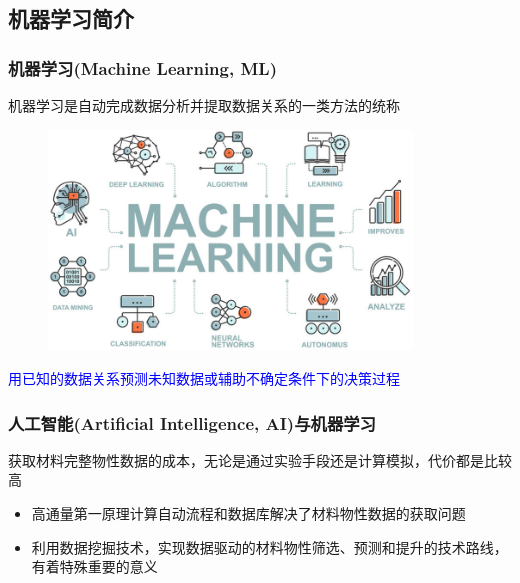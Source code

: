 \subsection{机器学习简介}
\frame
{
	\frametitle{机器学习\textrm{(Machine Learning, ML)}}
机器学习是自动完成数据分析并提取数据关系的一类方法的统称
\begin{figure}[h!]
\centering
\vspace*{-0.1in}
\includegraphics[height=2.3in,width=3.8in,viewport=0 0 630 390,clip]{Figures/Machine_Learning.jpg}
\label{Machine-Learning}
\end{figure}
\textcolor{blue}{用已知的数据关系预测未知数据或辅助不确定条件下的决策过程}
}

\frame
{
	\frametitle{人工智能\textrm{(Artificial Intelligence, AI)}与机器学习}
		获取材料完整物性数据的成本，无论是通过实验手段还是计算模拟，代价都是比较高
		\begin{itemize}
			\item 高通量第一原理计算自动流程和数据库解决了材料物性数据的获取问题%
			\item 利用数据挖掘技术，实现数据驱动的材料物性筛选、预测和提升的技术路线，有着特殊重要的意义
		\end{itemize}
	\vskip 8pt
	{\fontsize{8.2pt}{6.2pt}}
}

